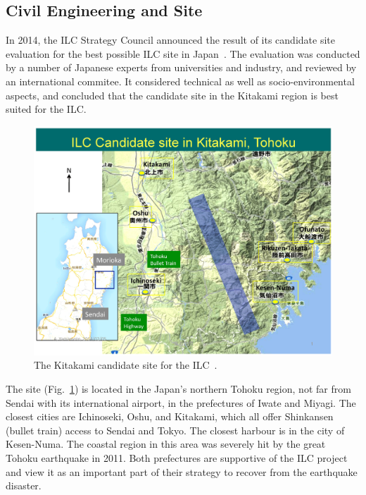 
\subsection{Civil Engineering and Site}


In 2014, the ILC Strategy Council announced the result of its candidate site evaluation for the best possible ILC site in Japan~\cite{ILCSC:2014a}.
The evaluation was conducted by a number of Japanese experts from universities and industry, and reviewed by an international commitee. 
It considered technical as well as socio-environmental aspects, and concluded that the candidate site in the Kitakami region is best suited for the ILC.

\begin{figure}[htbp]
   \includegraphics[width=\hsize]{chapters/figures/ILC-Candidate-Area2}
\caption{The Kitakami candidate site for the ILC~\cite{Warmbein:2014a}.}
\label{fig:kitakami-site}
\end{figure}

The site (Fig.~\ref{fig:kitakami-site}) is located in the Japan's northern Tohoku region, not far from Sendai with its international airport, in the prefectures of Iwate and Miyagi.
The closest cities are Ichinoseki, Oshu, and Kitakami, which all offer Shinkansen (bullet train) access to Sendai and Tokyo.
The closest harbour is in the city of Kesen-Numa.
The coastal region in this area was severely hit by the great Tohoku earthquake in 2011. 
Both prefectures are supportive of the ILC project and view it as an important part of their strategy to recover from the earthquake disaster.

